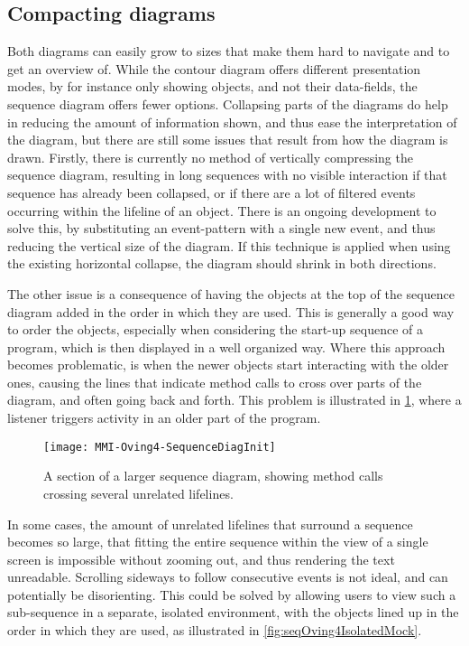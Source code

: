 \subsection{Compacting diagrams}\label{jiveSuggestionsCompact}
Both diagrams can easily grow to sizes that make them hard to navigate and to get an overview of.
While the contour diagram offers different presentation modes, by for instance only showing objects, and not their data-fields, the sequence diagram offers fewer options.
Collapsing parts of the diagrams do help in reducing the amount of information shown, and thus ease the interpretation of the diagram, but there are still some issues that result from how the diagram is drawn.
Firstly, there is currently no method of vertically compressing the sequence diagram, resulting in long sequences with no visible interaction if that sequence has already been collapsed, or if there are a lot of filtered events occurring within the lifeline of an object.
There is an ongoing development to solve this, by substituting an event-pattern with a single new event, and thus reducing the vertical size of the diagram.
If this technique is applied when using the existing horizontal collapse, the diagram should shrink in both directions.

The other issue is a consequence of having the objects at the top of the sequence diagram added in the order in which they are used.
This is generally a good way to order the objects, especially when considering the start-up sequence of a program, which is then displayed in a well organized way.
Where this approach becomes problematic, is when the newer objects start interacting with the older ones, causing the lines that indicate method calls to cross over parts of the diagram, and often going back and forth.
This problem is illustrated in \cref{fig:seqOving4CrossLines}, where a listener triggers activity in an older part of the program.

\begin{figure}[H]
	\centering
	\texttt{[image: MMI-Oving4-SequenceDiagInit]}
	\caption{A section of a larger sequence diagram, showing method calls crossing several unrelated lifelines.}
	\label{fig:seqOving4CrossLines}
\end{figure}

In some cases, the amount of unrelated lifelines that surround a sequence becomes so large, that fitting the entire sequence within the view of a single screen is impossible without zooming out, and thus rendering the text unreadable.
Scrolling sideways to follow consecutive events is not ideal, and can potentially be disorienting.
This could be solved by allowing users to view such a sub-sequence in a separate, isolated environment, with the objects lined up in the order in which they are used, as illustrated in \cref{fig:seqOving4IsolatedMock}.

